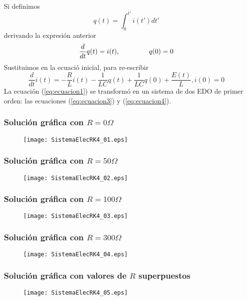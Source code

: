 \begin{frame}
Si definimos
\begin{equation}\label{eq:ecuacion2}
	q(t) = \int_{0}^{t'} i(t') dt'
\end{equation}
derivando la expresión anterior
\begin{equation}\label{eq:ecuacion3}
	\dfrac{d}{dt}q(t) = i(t), \hspace{1.5cm} q(0)=0
\end{equation}
Sustituimos en la ecuació inicial, para re-escribir
\fontsize{12}{12}\selectfont
\begin{equation}\label{eq:ecuacion4}
	\dfrac{d}{dt}i(t) = -\dfrac{R}{L}i(t) - \dfrac{1}{LC} q(t) + \dfrac{1}{LC}q(0) + \dfrac{E(t)}{L}, i(0)=0 
\end{equation}
La ecuación (\ref{eq:ecuacion1}) se transformó en un sistema de dos EDO de primer orden: las ecuaciones (\ref{eq:ecuacion3}) y (\ref{eq:ecuacion4}).
\end{frame}
\begin{frame}
\frametitle{Solución gráfica con $R=0 \Omega$}
\begin{figure}
	\centering
	\texttt{[image: SistemaElecRK4\_01.eps]} 
\end{figure}
\end{frame}
\begin{frame}
\frametitle{Solución gráfica con $R=50 \Omega$}
\begin{figure}
	\centering
	\texttt{[image: SistemaElecRK4\_02.eps]} 
\end{figure}
\end{frame}
\begin{frame}
\frametitle{Solución gráfica con $R=100 \Omega$}
\begin{figure}
	\centering
	\texttt{[image: SistemaElecRK4\_03.eps]} 
\end{figure}
\end{frame}
\begin{frame}
\frametitle{Solución gráfica con $R=300 \Omega$}
\begin{figure}
	\centering
	\texttt{[image: SistemaElecRK4\_04.eps]} 
\end{figure}
\end{frame}
\begin{frame}
\frametitle{Solución gráfica con valores de $R$ superpuestos}
\begin{figure}
	\centering
	\texttt{[image: SistemaElecRK4\_05.eps]} 
\end{figure}
\end{frame}

